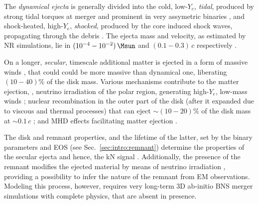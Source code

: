 The \textit{dynamical ejecta} is generally divided into 
the cold, low-$Y_e$, \textit{tidal}, produced by strong tidal torques at merger 
and prominent in very assymetric binaries
\citep{Rosswog:1998hy,Radice:2016dwd,Dietrich:2016hky},
and shock-heated, high-$Y_e$, \textit{shocked}, produced 
by the core \bnc{} induced shock waves, propagating through the \pmerg{} debris 
\citep{Radice:2018pdn}. %
%
The ejecta mass and velocity, as estimated by \ac{NR} simulations, lie in 
$(10^{-4}-10^{-2})\,\Msun$ and $(0.1-0.3)\,c$ respectively 
\citep{Hotokezaka:2013b,Bauswein:2013yna,Sekiguchi:2016bjd,Radice:2018pdn}.

On a longer, \textit{secular}, timescale additional matter is ejected in a form of 
massive winds \citep{Lee:2009,Perego:2014fma,Fernandez:2015use,Siegel:2017nub,
    Fujibayashi:2017puw,Fernandez:2018kax,Miller:2019dpt}, %
that could could be more massive than dynamical one, liberating $(10-40)\%$ of the disk mass. 
Various mechanisms contribute to 
the matter ejection, \eg, neutrino irradiation of the polar region, generating high-$Y_e$, 
low-mass winds \citep{Perego:2014fma,Miller:2019dpt}; nuclear recombination in the outer 
part of the disk (after it expanded due to viscous and thermal processes) that can eject 
${\sim}(10-20)\%$ of the disk mass at ${\sim}0.1\,c$ \citep{Lee:2009,Fernandez:2015use,Fahlman:2018llv};
and \ac{MHD} effects facilitating matter ejection \citep{Fujibayashi:2017puw,Radice:2018xqa}.

The \pmerg{} disk and remnant properties, and the lifetime of the latter, set by the 
binary parameters and \ac{EOS} (see Sec.~\ref{sec:intro:remnant}) \citep{Radice:2018xqa,Perego:2019adq} 
determine the properties of the secular ejecta and hence, the \ac{kN} signal 
\citep[\eg][]{Radice:2018pdn}.
Additionally, the presence of the remnant modifies the ejected material by means of 
neutrino irradiation \citep{Fernandez:2015use}, providing a possibility to infer the nature of 
the remnant from \ac{EM} observations. Modeling this process, however, requires very long-term 
$3$D ab-initio \ac{BNS} merger simulations with complete physics, that are absent in presence.

